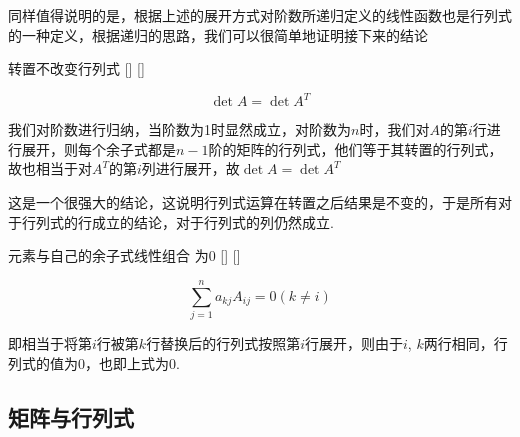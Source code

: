 \documentclass[UTF8]{ctexart}
\begin{document}
        同样值得说明的是，根据上述的展开方式对阶数所递归定义的线性函数也是行列式的一种定义，根据递归的思路，我们可以很简单地证明接下来的结论
    \begin{thm}
			[]
			{转置不改变行列式}
			[]
			[]

        \[\det A=\det A^{T}\]
    \end{thm}
    \begin{prf}
        我们对阶数进行归纳，当阶数为1时显然成立，对阶数为$n$时，我们对$A$的第$i$行进行展开，则每个余子式都是$n-1$阶的矩阵的行列式，他们等于其转置的行列式，故也相当于对$A^{T}$的第$i$列进行展开，故$\det A=\det A^{T}$
    \end{prf}
    这是一个很强大的结论，这说明行列式运算在转置之后结果是不变的，于是所有对于行列式的行成立的结论，对于行列式的列仍然成立.
    \begin{thm}
			[]
			{元素与自己的余子式线性组合 为0}
			[]
			[]

        \[\sum_{j=1}^na_{kj}A_{ij}=0(k\neq i)\]
    \end{thm}
    \begin{prf}
        即相当于将第$i$行被第$k$行替换后的行列式按照第$i$行展开，则由于$i$, $k$两行相同，行列式的值为0，也即上式为0.
    \end{prf}

    \subsection{矩阵与行列式}
\end{document}
